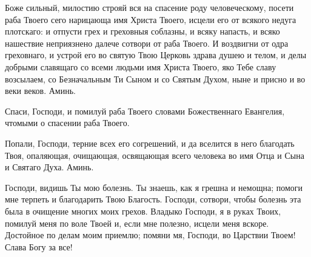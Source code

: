 \begin{mymulticols}


Боже сильный, милостию строяй вся на спасение роду человеческому, посети раба Твоего сего нарицающа имя Христа Твоего, исцели его от всякого недуга плотскаго: и отпусти грех и греховныя соблазны, и всяку напасть, и всяко нашествие неприязнено далече сотвори от раба Твоего. И воздвигни от одра греховнаго, и устрой его во святую Твою Церковь здрава душею и телом, и делы добрыми славящаго со всеми людьми имя Христа Твоего, яко Тебе славу возсылаем, со Безначальным Ти Сыном и со Святым Духом, ныне и присно и во веки веков. Аминь.

\end{mymulticols}

\mychapterending


\begin{mymulticols}
 






Спаси, Господи, и помилуй раба Твоего  словами Божественнаго Евангелия, чтомыми о спасении раба Твоего. 

Попали, Господи, терние всех его согрешений, и да вселится в него благодать Твоя, опаляющая, очищающая, освящающая всего человека во имя Отца и Сына и Святаго Духа. Аминь.




\end{mymulticols}

\mychapterending


\begin{mymulticols}
 


Господи, видишь Ты мою болезнь. Ты знаешь, как я грешна и немощна; помоги мне терпеть и благодарить Твою Благость. Господи, сотвори, чтобы болезнь эта была в очищение многих моих грехов. Владыко Господи, я в руках Твоих, помилуй меня по воле Твоей и, если мне полезно, исцели меня вскоре. Достойное по делам моим приемлю; помяни мя, Господи, во Царствии Твоем! Слава Богу за все!




\end{mymulticols}

\mychapterending



